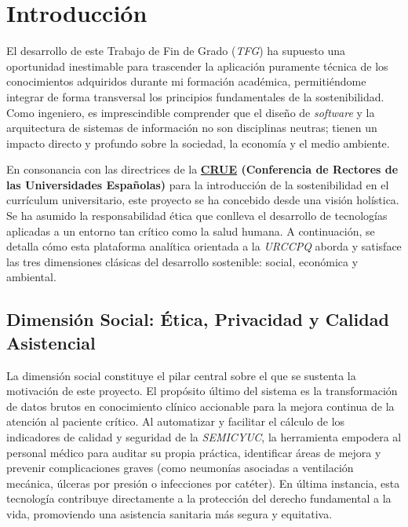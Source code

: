 
\section{Introducción}
El desarrollo de este Trabajo de Fin de Grado (\textit{TFG}) ha supuesto una oportunidad inestimable para trascender la aplicación puramente técnica de los conocimientos adquiridos durante mi formación académica, permitiéndome integrar de forma transversal los principios fundamentales de la sostenibilidad. Como ingeniero, es imprescindible comprender que el diseño de \textit{software} y la arquitectura de sistemas de información no son disciplinas neutras; tienen un impacto directo y profundo sobre la sociedad, la economía y el medio ambiente. 

En consonancia con las directrices de la \textbf{\href{https://www.crue.org/wp-content/uploads/2020/02/Directrices_Sosteniblidad_Crue2012.pdf}{CRUE} (Conferencia de Rectores de las Universidades Españolas)} para la introducción de la sostenibilidad en el currículum universitario, este proyecto se ha concebido desde una visión holística. Se ha asumido la responsabilidad ética que conlleva el desarrollo de tecnologías aplicadas a un entorno tan crítico como la salud humana. A continuación, se detalla cómo esta plataforma analítica orientada a la \textit{URCCPQ} aborda y satisface las tres dimensiones clásicas del desarrollo sostenible: social, económica y ambiental.

\subsection{Dimensión Social: Ética, Privacidad y Calidad Asistencial}
La dimensión social constituye el pilar central sobre el que se sustenta la motivación de este proyecto. El propósito último del sistema es la transformación de datos brutos en conocimiento clínico accionable para la mejora continua de la atención al paciente crítico. Al automatizar y facilitar el cálculo de los indicadores de calidad y seguridad de la \textit{SEMICYUC}, la herramienta empodera al personal médico para auditar su propia práctica, identificar áreas de mejora y prevenir complicaciones graves (como neumonías asociadas a ventilación mecánica, úlceras por presión o infecciones por catéter). En última instancia, esta tecnología contribuye directamente a la protección del derecho fundamental a la vida, promoviendo una asistencia sanitaria más segura y equitativa.

